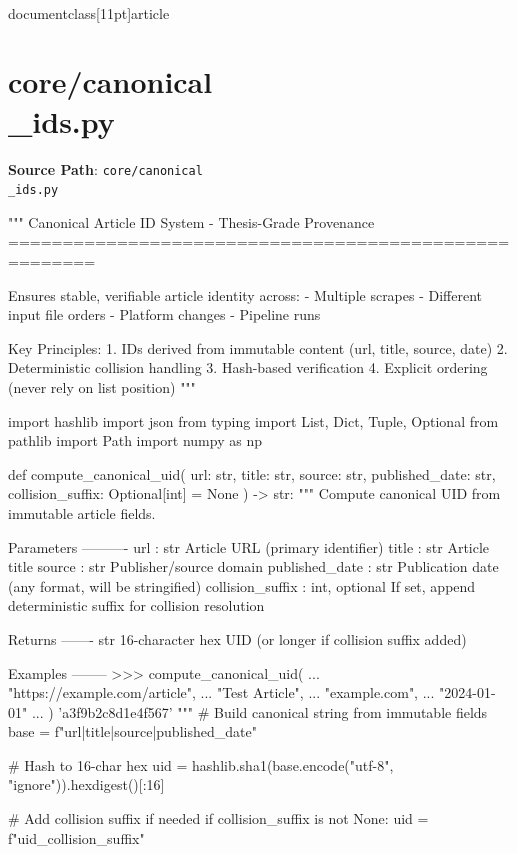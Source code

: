 \\documentclass[11pt]{article}
\begin{document}
\section*{core/canonical\\_ids.py}
\textbf{Source Path}: \texttt{core/canonical\\_ids.py}\par
\bigskip
\begin{CodeBlock}
"""
Canonical Article ID System - Thesis-Grade Provenance
======================================================

Ensures stable, verifiable article identity across:
- Multiple scrapes
- Different input file orders
- Platform changes
- Pipeline runs

Key Principles:
1. IDs derived from immutable content (url, title, source, date)
2. Deterministic collision handling
3. Hash-based verification
4. Explicit ordering (never rely on list position)
"""

import hashlib
import json
from typing import List, Dict, Tuple, Optional
from pathlib import Path
import numpy as np


def compute_canonical_uid(
    url: str,
    title: str,
    source: str,
    published_date: str,
    collision_suffix: Optional[int] = None
) -> str:
    """
    Compute canonical UID from immutable article fields.
    
    Parameters
    ----------
    url : str
        Article URL (primary identifier)
    title : str
        Article title
    source : str
        Publisher/source domain
    published_date : str
        Publication date (any format, will be stringified)
    collision_suffix : int, optional
        If set, append deterministic suffix for collision resolution
    
    Returns
    -------
    str
        16-character hex UID (or longer if collision suffix added)
    
    Examples
    --------
    >>> compute_canonical_uid(
    ...     "https://example.com/article",
    ...     "Test Article",
    ...     "example.com",
    ...     "2024-01-01"
    ... )
    'a3f9b2c8d1e4f567'
    """
    # Build canonical string from immutable fields
    base = f"{url}|{title}|{source}|{published_date}"
    
    # Hash to 16-char hex
    uid = hashlib.sha1(base.encode("utf-8", "ignore")).hexdigest()[:16]
    
    # Add collision suffix if needed
    if collision_suffix is not None:
        uid = f"{uid}_{collision_suffix}"
    

\end{CodeBlock}
\end{document}
